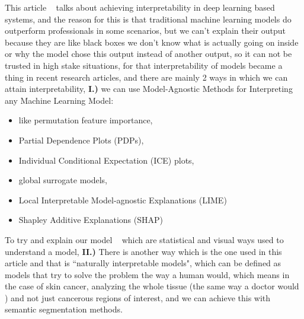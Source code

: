 This article ~\cite{Thomas2021} talks about achieving interpretability in deep learning based systems, and the reason for this is that traditional machine learning models do outperform professionals in some scenarios, but we can't explain their output because they are like black boxes we don't know what is actually going on inside or why the model chose this output instead of another output, so it can not be trusted in high stake situations, for that interpretability of models became a thing in recent research articles, and there are mainly 2 ways in which we can attain interpretability, \textbf{I.)} we can use Model-Agnostic Methods for Interpreting any Machine Learning Model:
\begin{itemize}
    \item like permutation feature importance, 
    \item Partial Dependence Plots (PDPs), 
    \item Individual Conditional Expectation (ICE) plots, 
    \item global surrogate models, 
    \item Local Interpretable Model-agnostic Explanations (LIME) 
    \item Shapley Additive Explanations (SHAP) 
\end{itemize}
To try and explain our model ~\cite{Hennie2020} which are statistical and visual ways used to understand a model, \textbf{II.)} There is another way which is the one used in this article and that is ``naturally interpretable models", which can be defined as models that try to solve the problem the way a human would, which means in the case of skin cancer, analyzing the whole tissue (the same way a doctor would ) and not just cancerous regions of interest, and we can achieve this with semantic segmentation methods.

